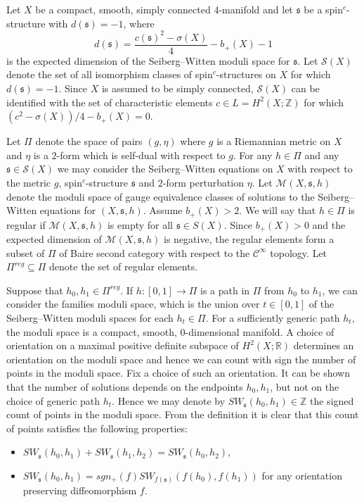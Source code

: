 \documentclass{amsart}
\theoremstyle{definition}
\theoremstyle{remark}
\numberwithin{equation}{section}
\begin{document}
Let $X$ be a compact, smooth, simply connected $4$-manifold and let $\mathfrak{s}$ be a spin$^c$-structure with $d(\mathfrak{s}) = -1$, where
\[
d(\mathfrak{s}) = \frac{ c(\mathfrak{s})^2 - \sigma(X) }{4} - b_+(X) - 1
\]
is the expected dimension of the Seiberg--Witten moduli space for $\mathfrak{s}$. Let $\mathcal{S}(X)$ denote the set of all isomorphism classes of spin$^c$-structures on $X$ for which $d(\mathfrak{s}) = -1$. Since $X$ is assumed to be simply connected, $\mathcal{S}(X)$ can be identified with the set of characteristic elements $c \in L = H^2(X ; \mathbb{Z})$ for which $( c^2 - \sigma(X))/4 - b_+(X) = 0$.

Let $\Pi$ denote the space of pairs $(g , \eta)$ where $g$ is a Riemannian metric on $X$ and $\eta$ is a $2$-form which is self-dual with respect to $g$. For any $h \in \Pi$ and any $\mathfrak{s} \in \mathcal{S}(X)$ we may consider the Seiberg--Witten equations on $X$ with respect to the metric $g$, spin$^c$-structure $\mathfrak{s}$ and $2$-form perturbation $\eta$. Let $\mathcal{M}(X,\mathfrak{s},h)$ denote the moduli space of gauge equivalence classes of solutions to the Seiberg--Witten equations for $(X,\mathfrak{s},h)$. Assume $b_+(X) > 2$. We will say that $h \in \Pi$ is regular if $\mathcal{M}(X , \mathfrak{s},h)$ is empty for all $\mathfrak{s} \in S(X)$. Since $b_+(X) > 0$ and the expected dimension of $\mathcal{M}(X,\mathfrak{s},h)$ is negative, the regular elements form a subset of $\Pi$ of Baire second category with respect to the $\mathcal{C}^\infty$ topology. Let $\Pi^{reg} \subseteq \Pi$ denote the set of regular elements.

Suppose that $h_0, h_1 \in \Pi^{reg}$. If $h : [0,1] \to \Pi$ is a path in $\Pi$ from $h_0$ to $h_1$, we can consider the families moduli space, which is the union over $t \in [0,1]$ of the Seiberg--Witten moduli spaces for each $h_t \in \Pi$. For a sufficiently generic path $h_t$, the moduli space is a compact, smooth, $0$-dimensional manifold. A choice of orientation on a maximal positive definite subspace of $H^2(X ; \mathbb{R})$ determines an orientation on the moduli space and hence we can count with sign the number of points in the moduli space. Fix a choice of such an orientation.  It can be shown \cite{rub1} that the number of solutions depends on the endpoints $h_0, h_1$, but not on the choice of generic path $h_t$. Hence we may denote by $SW_{\mathfrak{s}}( h_0 , h_1) \in \mathbb{Z}$ the signed count of points in the moduli space. From the definition it is clear that this count of points satisfies the following properties:
\begin{itemize}
\item[(1)]{$SW_{\mathfrak{s}}( h_0 , h_1) + SW_{\mathfrak{s}}(h_1 , h_2) = SW_{\mathfrak{s}}(h_0 , h_2)$,}
\item[(2)]{$SW_{\mathfrak{s}}(h_0 , h_1 ) = sgn_+(f) SW_{f(\mathfrak{s})}( f(h_0) , f(h_1) )$ for any orientation preserving diffeomorphism $f$.}
\end{itemize}
\end{document}
